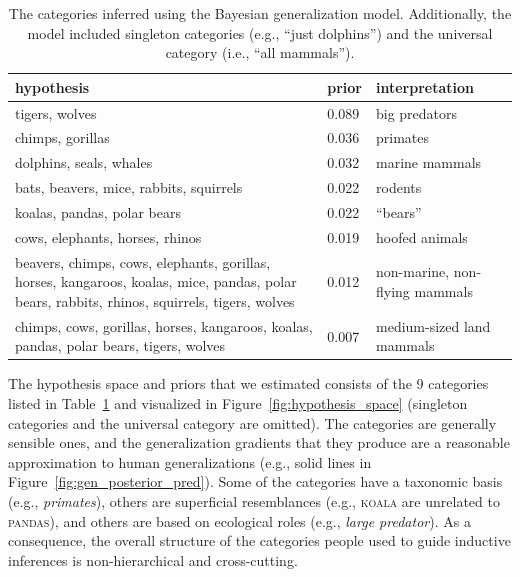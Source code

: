 \documentclass[doc,floatsintext]{apa6}
\newcommand{\stimulus}[1]{\textsc{#1}}
\begin{document}
\begin{table}[t]
\caption{The categories inferred using the Bayesian generalization model. Additionally, the model included singleton categories (e.g., ``just dolphins'') and the universal category (i.e., ``all mammals''). \vspace*{6pt}}
\begin{center}
\begin{tabular}{p{7cm} | l | p{3cm}}
\textbf{hypothesis}	&	\textbf{prior} &	\textbf{interpretation}	\\
\hline
tigers, wolves & 0.089 & big predators \vspace*{3pt}\\
chimps, gorillas & 0.036 & primates \\
dolphins, seals, whales & 0.032 & marine mammals \\
bats, beavers, mice, rabbits, squirrels & 0.022 & rodents \\
koalas, pandas, polar bears & 0.022 & ``bears'' \\
cows, elephants, horses, rhinos & 0.019 & hoofed animals \vspace*{3pt}\\
beavers, chimps, cows, elephants, gorillas, horses, kangaroos, koalas, mice, pandas, polar bears, rabbits, rhinos, squirrels, tigers, wolves\vspace*{3pt} & 0.012 & non-marine, non-flying mammals  \\
chimps, cows, gorillas, horses, kangaroos, koalas, pandas, polar bears, tigers, wolves & 0.007 & medium-sized land mammals \\
\hline
\end{tabular}
\end{center}
\label{table:hypothesis_space}
\end{table}


The hypothesis space and priors that we estimated consists of the 9 categories listed in Table~\ref{table:hypothesis_space} and visualized in Figure~\ref{fig:hypothesis_space} (singleton categories and the universal category are omitted). The categories are generally sensible ones, and the generalization gradients that they produce are a reasonable approximation to human generalizations (e.g., solid lines in Figure~\ref{fig:gen_posterior_pred}). Some of the categories have a taxonomic basis (e.g., {\it primates}), others are superficial resemblances (e.g., \stimulus{koala} are unrelated to \stimulus{pandas}), and others are based on ecological roles (e.g., {\it large predator}). As a consequence, the overall structure of the categories people used to guide inductive inferences is non-hierarchical and cross-cutting.
\end{document}
